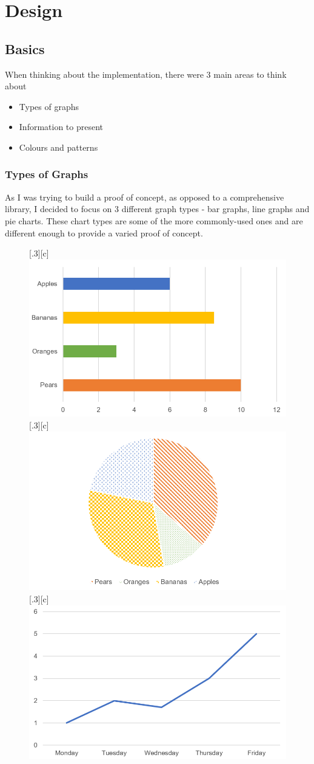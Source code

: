 \documentclass[ %
                    author={Aleena Baig},
                supervisor={Dr Simon Lock},
                    degree={BSc},
                     title={On Making Web Accessible Graphs},
                  subtitle={},
                      year={2019} ]{dissertation}
\begin{document}

\chapter{Design}

\section{Basics}

When thinking about the implementation, there were 3 main areas to think about

\begin{itemize}
    \item Types of graphs
    \item Information to present
    \item Colours and patterns
\end{itemize}

\subsection{Types of Graphs}

As I was trying to build a proof of concept, as opposed to a comprehensive library, I decided to focus on 3 different graph types - bar graphs, line graphs and pie charts. These chart types are some of the more commonly-used ones and are different enough to provide a varied proof of concept.
\newline
\begin{figure}[H]
  \centering
  [.3\linewidth][c]{%
    \includegraphics[width=.3\linewidth]{images/BarGraph.PNG}}\quad
  [.3\linewidth][c]{%
    \includegraphics[width=.3\linewidth]{images/PieGraph.PNG}}\quad
  [.3\linewidth][c]{%
    \includegraphics[width=.3\linewidth]{images/LineGraph.PNG}}
\end{figure}
\end{document}
